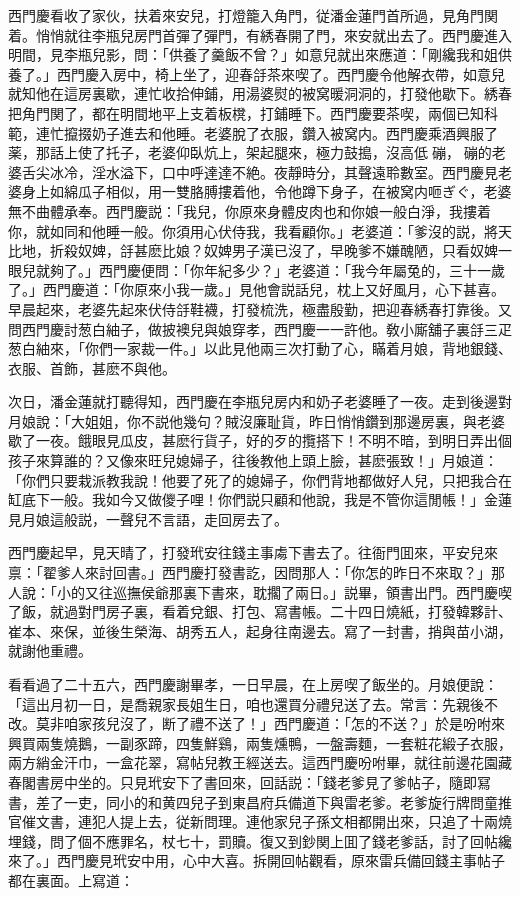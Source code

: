 西門慶看收了家伙，扶着來安兒，打燈籠入角門，従潘金蓮門首所過，見角門関着。悄悄就往李瓶兒房門首彈了彈門，有綉春開了門，來安就出去了。西門慶進入明間，見李瓶兒影，問：「供養了羹飯不曾？」如意兒就出來應道：「剛纔我和姐供養了。」西門慶入房中，椅上坐了，迎春㧱茶來喫了。西門慶令他解衣帶，如意兒就知他在這房裏歇，連忙收拾伸鋪，用湯婆熨的被窝暖洞洞的，打發他歇下。綉春把角門関了，都在明間地平上支着板櫈，打鋪睡下。西門慶要茶喫，兩個已知科範，連忙攛掇奶子進去和他睡。老婆脫了衣服，鑽入被窝内。西門慶乘酒興服了薬，那話上使了托子，老婆仰臥炕上，架起腿來，極力鼓搗，沒高低𢵞磞，𢵞磞的老婆舌尖冰冷，淫水溢下，口中呼達達不絶。夜靜時分，其聲遠聆數室。西門慶見老婆身上如綿瓜子相似，用一雙胳膊摟着他，令他蹲下身子，在被窝内咂ぎぐ，老婆無不曲體承奉。西門慶説：「我兒，你原來身體皮肉也和你娘一般白淨，我摟着你，就如同和他睡一般。你須用心伏侍我，我看顧你。」老婆道：「爹沒的説，將天比地，折殺奴婢，㧱甚麽比娘？奴婢男子漢已沒了，早晚爹不嫌醜陋，只看奴婢一眼兒就夠了。」西門慶便問：「你年紀多少？」老婆道：「我今年屬兔的，三十一歲了。」西門慶道：「你原來小我一歲。」見他會説話兒，枕上又好風月，心下甚喜。早晨起來，老婆先起來伏侍㧱鞋襪，打發梳洗，極盡殷勤，把迎春綉春打靠後。又問西門慶討葱白紬子，做披襖兒與娘穿孝，西門慶一一許他。敎小廝舖子裏㧱三疋葱白紬來，「你們一家裁一件。」以此見他兩三次打動了心，瞞着月娘，背地銀錢、衣服、首飾，甚麽不與他。

次日，潘金蓮就打聽得知，西門慶在李瓶兒房内和奶子老婆睡了一夜。走到後邊對月娘說：「大姐姐，你不説他幾句？賊沒廉耻貨，昨日悄悄鑽到那邊房裏，與老婆歇了一夜。餓眼見瓜皮，甚麽行貨子，好的歹的攬搭下！不明不暗，到明日弄出個孩子來算誰的？又像來旺兒媳婦子，往後教他上頭上臉，甚麽張致！」月娘道：「你們只要栽派教我說！他要了死了的媳婦子，你們背地都做好人兒，只把我合在缸底下一般。我如今又做儍子哩！你們説只顧和他說，我是不管你這閒帳！」金蓮見月娘這般説，一聲兒不言語，走回房去了。

西門慶起早，見天晴了，打發玳安往錢主事䖏下書去了。往衙門囬來，平安兒來禀：「翟爹人來討回書。」西門慶打發書訖，因問那人：「你怎的昨日不來取？」那人說：「小的又往巡撫侯爺那裏下書來，耽擱了兩日。」説畢，領書出門。西門慶喫了飯，就過對門房子裏，看着兌銀、打包、寫書帳。二十四日燒紙，打發韓夥計、崔本、來保，並後生榮海、胡秀五人，起身往南邊去。寫了一封書，捎與苗小湖，就謝他重禮。

看看過了二十五六，西門慶謝畢孝，一日早晨，在上房喫了飯坐的。月娘便說：「這出月初一日，是喬親家長姐生日，咱也還買分禮兒送了去。常言：先親後不改。莫非咱家孩兒沒了，断了禮不送了！」西門慶道：「怎的不送？」於是吩咐來興買兩隻燒鵝，一副豕蹄，四隻鮮鷄，兩隻燻鴨，一盤壽麵，一套粧花緞子衣服，兩方綃金汗巾，一盒花翠，寫帖兒教王經送去。這西門慶吩咐畢，就往前邊花園藏春閣書房中坐的。只見玳安下了書回來，回話説：「錢老爹見了爹帖子，隨即冩書，差了一吏，同小的和黄四兒子到東昌府兵備道下與雷老爹。老爹旋行牌問童推官催文書，連犯人提上去，従新問理。連他家兒子孫文相都開出來，只追了十兩燒埋錢，問了個不應罪名，杖七十，罰贖。復又到鈔関上囬了錢老爹話，討了回帖纔來了。」西門慶見玳安中用，心中大喜。拆開回帖觀看，原來雷兵備回錢主事帖子都在裏面。上寫道：

